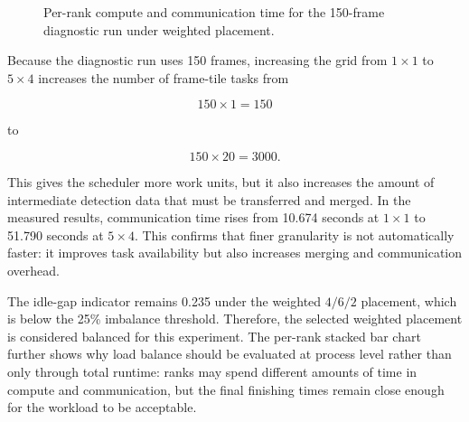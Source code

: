 \begin{figure}[H]
\centering
{}
\caption{Per-rank compute and communication time for the 150-frame diagnostic run under weighted placement.}
\label{fig:rank-stacked}
\end{figure}

Because the diagnostic run uses 150 frames, increasing the grid from $1 \times 1$ to $5 \times 4$ increases the number of frame-tile tasks from

\[
150 \times 1 = 150
\]

to

\[
150 \times 20 = 3000.
\]

This gives the scheduler more work units, but it also increases the amount of intermediate detection data that must be transferred and merged. In the measured results, communication time rises from 10.674 seconds at $1 \times 1$ to 51.790 seconds at $5 \times 4$. This confirms that finer granularity is not automatically faster: it improves task availability but also increases merging and communication overhead.


The idle-gap indicator remains 0.235 under the weighted $4/6/2$ placement, which is below the 25\% imbalance threshold. Therefore, the selected weighted placement is considered balanced for this experiment. The per-rank stacked bar chart further shows why load balance should be evaluated at process level rather than only through total runtime: ranks may spend different amounts of time in compute and communication, but the final finishing times remain close enough for the workload to be acceptable.



